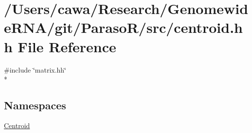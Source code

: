 \hypertarget{centroid_8hh}{\section{/\+Users/cawa/\+Research/\+Genomewide\+R\+N\+A/git/\+Paraso\+R/src/centroid.hh File Reference}
\label{centroid_8hh}
}
{\ttfamily \#include \char`\"{}matrix.\+hh\char`\"{}}\\*
\subsection*{Namespaces}
\begin{DoxyCompactItemize}
\item 
 \hyperlink{namespace_centroid}{Centroid}
\end{DoxyCompactItemize}

